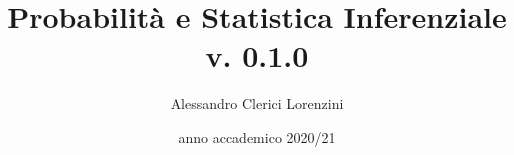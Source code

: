 \documentclass[a4paper]{article}
\begin{document}
\title{Probabilità e Statistica Inferenziale\\{\small v. 0.1.0}}
\author{Alessandro Clerici Lorenzini}
\date{anno accademico 2020/21}
\maketitle
\tableofcontents








\end{document}
